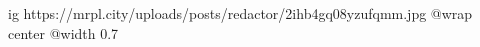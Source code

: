  
 
 
 
 

\ifcmt
  ig https://mrpl.city/uploads/posts/redactor/2ihb4gq08yzufqmm.jpg
  @wrap center
  @width 0.7
\fi
